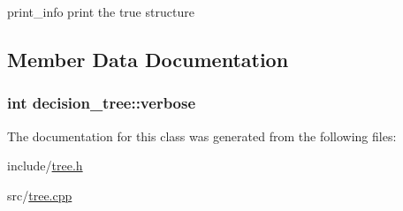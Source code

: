 print\+\_\+info print the true structure 



\subsection{Member Data Documentation}
\hypertarget{classdecision__tree_adef4736597a44918d4e221acbfb3142b}{
\subsubsection[{verbose}]{\setlength{\rightskip}{0pt plus 5cm}int decision\+\_\+tree\+::verbose\hspace{0.3cm}{\ttfamily [private]}}}\label{classdecision__tree_adef4736597a44918d4e221acbfb3142b}


The documentation for this class was generated from the following files\+:\begin{DoxyCompactItemize}
\item 
include/\hyperlink{tree_8h}{tree.\+h}\item 
src/\hyperlink{tree_8cpp}{tree.\+cpp}\end{DoxyCompactItemize}
